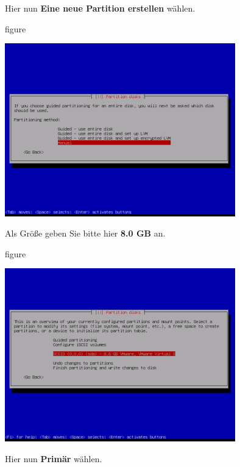 Hier nun \textbf{Eine neue Partition erstellen} wählen.

\begin{nofloat}{figure}
\begin{center}
\includegraphics[width=0.75\textwidth]{screenshots/11_ubuntu_install.png}
\end{center}
\end{nofloat}

\pagebreak
Als Größe geben Sie bitte hier \textbf{8.0 GB} an.

\begin{nofloat}{figure}
\begin{center}
\includegraphics[width=0.75\textwidth]{screenshots/12_ubuntu_install.png}
\end{center}
\end{nofloat}

Hier nun \textbf{Primär} wählen.

